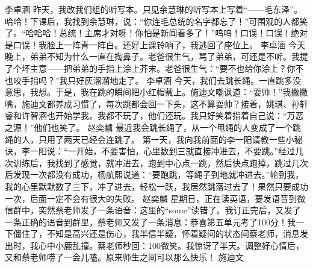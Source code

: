 \markdownRendererDocumentBegin
{}\markdownRendererInterblockSeparator
{}\markdownRendererInterblockSeparator
{}李卓涵\markdownRendererInterblockSeparator
{}昨天，我改我们组的听写本。只见余慧琳的听写本上写着“——毛东泽”。哈哈！下课后，我找到余慧琳，说：“你连毛总统的名字都忘了！”可围观的人都笑了。“哈哈哈！总统！主席才对呀！你怕是新闻看多了！”呜呜！口误！口误！绝对是口误！我脸上一阵青一阵白。还好上课铃响了，我逃回了座位上。\markdownRendererInterblockSeparator
{}\markdownRendererInterblockSeparator
{}李卓涵\markdownRendererInterblockSeparator
{}今天晚上，弟弟不知为什么一直在掏鼻子。老爸很生气，骂了弟弟，可还是不听。我提了个坏主意——把弟弟的手指上涂上芥末。老爸很生气：“要不也给你涂上？你不也咬手指吗？”我只好灰溜溜地走了。\markdownRendererInterblockSeparator
{}\markdownRendererInterblockSeparator
{}李卓涵\markdownRendererInterblockSeparator
{}今天，我们去跳长绳。一直跳多没意思，我想。于是，我在跳的瞬间把小红帽戴上。施迪文嘲讽道：“耍帅！”我撇撇嘴，施迪文都养成习惯了，每次跳都会回一下头，这不算耍帅？接着，姚琪、孙轩睿和许智涵也开始学我。我都不玩了，他们还玩。我只好笑着指着自己说：“万恶之源！”他们也笑了。\markdownRendererInterblockSeparator
{}\markdownRendererInterblockSeparator
{}赵奕麟\markdownRendererInterblockSeparator
{}最近我会跳长绳了，从一个甩绳的人变成了一个跳绳的人，只用了两天已经会连跳了。 第一天，我向我前面的李一阳请教一些小秘诀，李一阳说：“一开始，不要害怕，心里数到三就直接冲进去，不要跳。”经过几次训练后，我找到了感觉，就冲进去，跑到中心点一跳，然后快点跑掉，跳过几次后发现一次都没有成功，杨航熙说道：“要跑跳，等绳子到地就冲进去。”轮到我，我的心里默默数了三下，冲了进去，轻松一跃，我居然跳落过去了！果然只要成功一次，后面一定不会有很大的失败。\markdownRendererInterblockSeparator
{}\markdownRendererInterblockSeparator
{}赵奕麟\markdownRendererInterblockSeparator
{}星期日，正在读英语，要发语音到微信群中，突然蔡老师发了一条语音：这里的“some”读错了。我订正完后，又发了一条正确的语音到群里，蔡老师又发了一条消息：恭喜第五单元考了100分！我一下僵住了，不知是高兴还是伤心，我半信半疑，怀着疑问的状态问蔡老师，消息发出时，我心中小鹿乱撞。蔡老师秒回：100微笑。我惊讶了半天。调整好心情后，又和蔡老师唠了一会儿嗑。原来师生之间可以那么快乐！\markdownRendererInterblockSeparator
{}\markdownRendererInterblockSeparator
{}施迪文\markdownRendererInterblockSeparator
